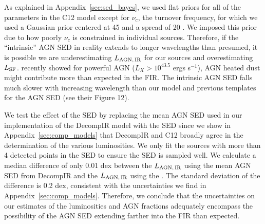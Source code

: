 \documentclass[fleqn, usenatbib]{mnras}
\begin{document}
As explained in Appendix~\ref{sec:sed_bayes}, we used flat priors for all of the parameters in the C12 model except for $\nu_{c}$, the turnover frequency, for which we used a Gaussian prior centered at 45 \micron{} and a spread of 20 \micron. We imposed this prior due to how poorly $\nu_{c}$ is constrained in individual sources. Therefore, if the ``intrinsic'' AGN SED in reality extends to longer wavelengths than presumed, it is possible we are underestimating $L_{\rm AGN,\,IR}$ for our sources and overestimating $L_{\rm SF}$. \citet{Symeonidis:2016fk} recently showed for powerful AGN ($L_{X} > 10^{43.5}$ ergs s$^{-1}$), AGN heated dust might contribute more than expected in the FIR. The \citet{Symeonidis:2016fk} intrinsic AGN SED falls much slower with increasing wavelength than our model and previous templates for the AGN SED (see their Figure 12). 

We test the effect of the \citet{Symeonidis:2016fk} SED by replacing the mean AGN SED used in our implementation of the DecompIR model with the \citet{Symeonidis:2016fk} SED since we show in Appendix~\ref{sec:comp_models} that DecompIR and C12 broadly agree in the determination of the various luminosities. We only fit the sources with more than 4 detected points in the SED to ensure the SED is sampled well. We calculate a median difference of only 0.01 dex between the $L_{\rm AGN,\,IR}$ using the mean AGN SED from DecompIR and the $L_{\rm AGN,\,IR}$ using the \citet{Symeonidis:2016fk}. The standard deviation of the difference is 0.2 dex, consistent with the uncertainties we find in Appendix~\ref{sec:comp_models}. Therefore, we conclude that the uncertainties on our estimates of the luminosities and AGN fractions adequately encompass the possibility of the AGN SED extending farther into the FIR than expected.
\end{document}
